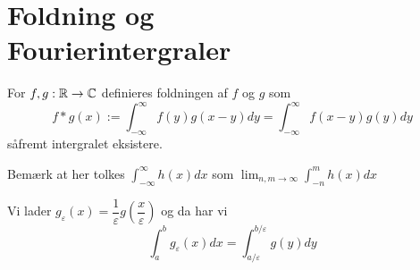 \chapter{Foldning og \\Fourierintergraler}
\begin{definition}
  For $f, g: \mathbb{R} \to \mathbb{C}$ definieres foldningen af $f$ og $g$ som
  \begin{equation*}
    f * g(x) := \int_{-\infty}^{\infty} f(y)g(x - y) dy = \int_{-\infty}^{\infty} f(x - y)g(y) dy
  \end{equation*}
  såfremt intergralet eksistere.
\end{definition}
\begin{remark}
  Bemærk at her tolkes $\displaystyle \int_{-\infty}^{\infty} h(x) dx$ som $\displaystyle \lim_{n,m \to \infty} \int_{-n}^m h(x) dx$
\end{remark}

%
Vi lader $g_{\varepsilon}(x) = \dfrac{1}{\varepsilon} g \left(\dfrac{x}{\varepsilon}\right)$ og da har vi
\begin{equation}\label{eq:topic4.1}
  \int_a^b g_{\varepsilon}(x) dx = \int_{a/\varepsilon}^{b/\varepsilon} g(y) dy
\end{equation}

